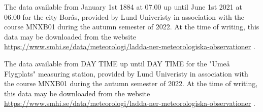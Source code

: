 \documentclass[a4, 12pt]{article}
\begin{document}
\noindent [3] The data available from January 1st 1884 at 07.00 up until June 1st 2021 at 06.00 for the city Borås, provided by Lund Univeristy in association with the course MNXB01 during the autumn semester of 2022. At the time of writing, this data may be downloaded from the website \href{https://www.smhi.se/data/meteorologi/ladda-ner-meteorologiska-observationer}{https://www.smhi.se/data/meteorologi/ladda-ner-meteorologiska-observationer}  . \newline


\noindent [4] The data available from DAY TIME up until DAY TIME for the "Umeå Flygplats" measuring station, provided by Lund Univeristy in association with the course MNXB01 during the autumn semester of 2022. At the time of writing, this data may be downloaded from the website \href{https://www.smhi.se/data/meteorologi/ladda-ner-meteorologiska-observationer}{https://www.smhi.se/data/meteorologi/ladda-ner-meteorologiska-observationer} . 
\end{document}
